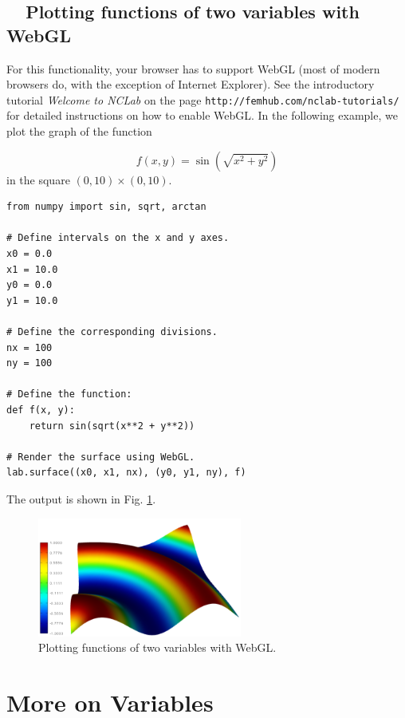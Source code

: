 \subsection{\ \ Plotting functions of two variables with WebGL}

For this functionality, your browser has to support WebGL (most of modern browsers do, 
with the exception of Internet Explorer). See the introductory tutorial {\em Welcome to NCLab}
on the page {\tt http://femhub.com/nclab-tutorials/} for detailed instructions on how to enable WebGL. 
In the following example, we plot the graph of the function 

$$
  f(x, y) = \sin(\sqrt{x^2 + y^2})
$$
in the square $(0, 10) \times (0, 10)$.

\begin{verbatim}
from numpy import sin, sqrt, arctan

# Define intervals on the x and y axes.
x0 = 0.0
x1 = 10.0
y0 = 0.0
y1 = 10.0

# Define the corresponding divisions.
nx = 100
ny = 100

# Define the function:
def f(x, y):
    return sin(sqrt(x**2 + y**2))

# Render the surface using WebGL.
lab.surface((x0, x1, nx), (y0, y1, ny), f)
\end{verbatim}
The output is shown in Fig. \ref{fig:webgl}.

\begin{figure}[!ht]
\begin{center}
\includegraphics[width=0.6\textwidth]{imgp/webgl.png}
\end{center}
\vspace{-2mm}
\caption{Plotting functions of two variables with WebGL.}
\label{fig:webgl}
\end{figure}


\section{More on Variables}


